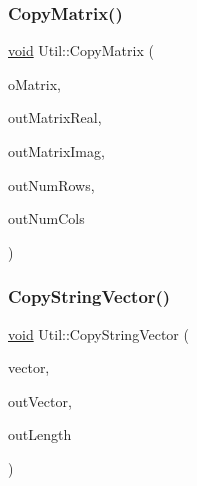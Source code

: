 \mbox{\label{class_l_i_b___l_a_1_1_util_a0337ee1331db4c191f46d476c7b21b63}} 
\subsubsection{\texorpdfstring{Copy\+Matrix()}{CopyMatrix()}\hspace{0.1cm}{\footnotesize\ttfamily [3/3]}}
{\footnotesize\ttfamily \hyperlink{lp__lib_8h_ac7828c7b2b31d2e11af17bdb6289c5d9}{void} Util\+::\+Copy\+Matrix (\begin{DoxyParamCaption}\item[{Complex\+Matrix \&}]{o\+Matrix,  }\item[{double $\ast$$\ast$\&}]{out\+Matrix\+Real,  }\item[{double $\ast$$\ast$\&}]{out\+Matrix\+Imag,  }\item[{\hyperlink{lp__lib_8h_adeb9ec6400320e4923ac9d836d509ddb}{int} \&}]{out\+Num\+Rows,  }\item[{\hyperlink{lp__lib_8h_adeb9ec6400320e4923ac9d836d509ddb}{int} \&}]{out\+Num\+Cols }\end{DoxyParamCaption})\hspace{0.3cm}{\ttfamily [static]}}

\mbox{\label{class_l_i_b___l_a_1_1_util_a07e106a22618ca41385b878e23156593}} 
\subsubsection{\texorpdfstring{Copy\+String\+Vector()}{CopyStringVector()}}
{\footnotesize\ttfamily \hyperlink{lp__lib_8h_ac7828c7b2b31d2e11af17bdb6289c5d9}{void} Util\+::\+Copy\+String\+Vector (\begin{DoxyParamCaption}\item[{const std\+::vector$<$ std\+::string $>$ \&}]{vector,  }\item[{char $\ast$$\ast$\&}]{out\+Vector,  }\item[{\hyperlink{lp__lib_8h_adeb9ec6400320e4923ac9d836d509ddb}{int} \&}]{out\+Length }\end{DoxyParamCaption})\hspace{0.3cm}{\ttfamily [static]}}

